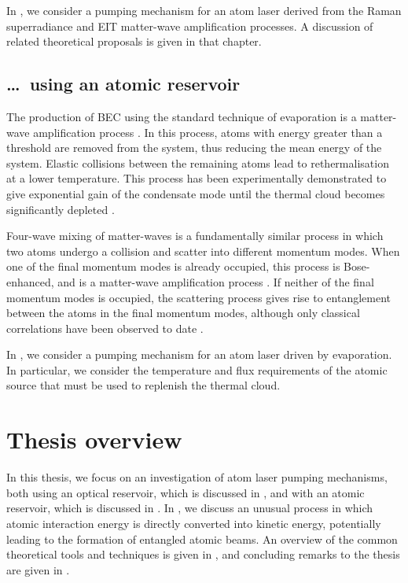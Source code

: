 In , we consider a pumping mechanism for an atom laser derived from the Raman superradiance and EIT matter-wave amplification processes.  A discussion of related theoretical proposals is given in that chapter.


\subsection{\dots\ using an atomic reservoir}

The production of BEC using the standard technique of evaporation \citep{Hess:1986,Ketterle:1996} is a matter-wave amplification process \citep{Luiten:1996,Gardiner:1997uq,Miesner:1998}.  In this process, atoms with energy greater than a threshold are removed from the system, thus reducing the mean energy of the system.  Elastic collisions between the remaining atoms lead to rethermalisation at a lower temperature.  This process has been experimentally demonstrated to give exponential gain of the condensate mode until the thermal cloud becomes significantly depleted \citep{Miesner:1998}.

Four-wave mixing of matter-waves \citep{Deng:1999qy} is a fundamentally similar process in which two atoms undergo a collision and scatter into different momentum modes.  When one of the final momentum modes is already occupied, this process is Bose-enhanced, and is a matter-wave amplification process \citep{Vogels:2002}.  If neither of the final momentum modes is occupied, the scattering process gives rise to entanglement between the atoms in the final momentum modes, although only classical correlations have been observed to date \citep{Perrin:2007}.

In , we consider a pumping mechanism for an atom laser driven by evaporation.  In particular, we consider the temperature and flux requirements of the atomic source that must be used to replenish the thermal cloud.

\section{Thesis overview}

In this thesis, we focus on an investigation of atom laser pumping mechanisms, both using an optical reservoir, which is discussed in , and with an atomic reservoir, which is discussed in .  In , we discuss an unusual process in which atomic interaction energy is directly converted into kinetic energy, potentially leading to the formation of entangled atomic beams.  An overview of the common theoretical tools and techniques is given in , and concluding remarks to the thesis are given in .

